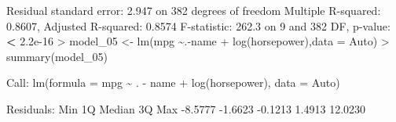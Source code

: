 \documentclass[
]{article}
\newenvironment{Shaded}{\begin{snugshade}}{\end{snugshade}}
\newcommand{\AttributeTok}[1]{\textcolor[rgb]{0.77,0.63,0.00}{#1}}
\newcommand{\DecValTok}[1]{\textcolor[rgb]{0.00,0.00,0.81}{#1}}
\newcommand{\ErrorTok}[1]{\textcolor[rgb]{0.64,0.00,0.00}{\textbf{#1}}}
\newcommand{\FloatTok}[1]{\textcolor[rgb]{0.00,0.00,0.81}{#1}}
\newcommand{\FunctionTok}[1]{\textcolor[rgb]{0.00,0.00,0.00}{#1}}
\newcommand{\NormalTok}[1]{#1}
\newcommand{\OtherTok}[1]{\textcolor[rgb]{0.56,0.35,0.01}{#1}}
\newcommand{\SpecialCharTok}[1]{\textcolor[rgb]{0.00,0.00,0.00}{#1}}
\begin{document}
\begin{Shaded}
\begin{Highlighting}[]
\NormalTok{Residual standard error}\SpecialCharTok{:} \FloatTok{2.947}\NormalTok{ on }\DecValTok{382}\NormalTok{ degrees of freedom}
\NormalTok{Multiple R}\SpecialCharTok{{-}}\NormalTok{squared}\SpecialCharTok{:}  \FloatTok{0.8607}\NormalTok{,    Adjusted R}\SpecialCharTok{{-}}\NormalTok{squared}\SpecialCharTok{:}  \FloatTok{0.8574} 
\NormalTok{F}\SpecialCharTok{{-}}\NormalTok{statistic}\SpecialCharTok{:} \FloatTok{262.3}\NormalTok{ on }\DecValTok{9}\NormalTok{ and }\DecValTok{382}\NormalTok{ DF,  p}\SpecialCharTok{{-}}\NormalTok{value}\SpecialCharTok{:} \ErrorTok{\textless{}} \FloatTok{2.2e{-}16}
\SpecialCharTok{\textgreater{}}\NormalTok{ model\_05 }\OtherTok{\textless{}{-}} \FunctionTok{lm}\NormalTok{(mpg }\SpecialCharTok{\textasciitilde{}}\NormalTok{.}\SpecialCharTok{{-}}\NormalTok{name }\SpecialCharTok{+} \FunctionTok{log}\NormalTok{(horsepower),}\AttributeTok{data =}\NormalTok{ Auto)}
\SpecialCharTok{\textgreater{}} \FunctionTok{summary}\NormalTok{(model\_05)}

\NormalTok{Call}\SpecialCharTok{:}
\FunctionTok{lm}\NormalTok{(}\AttributeTok{formula =}\NormalTok{ mpg }\SpecialCharTok{\textasciitilde{}}\NormalTok{ . }\SpecialCharTok{{-}}\NormalTok{ name }\SpecialCharTok{+} \FunctionTok{log}\NormalTok{(horsepower), }\AttributeTok{data =}\NormalTok{ Auto)}

\NormalTok{Residuals}\SpecialCharTok{:}
\NormalTok{    Min      1Q  Median      3Q     Max }
\SpecialCharTok{{-}}\FloatTok{8.5777} \SpecialCharTok{{-}}\FloatTok{1.6623} \SpecialCharTok{{-}}\FloatTok{0.1213}  \FloatTok{1.4913} \FloatTok{12.0230} 


\end{Highlighting}
\end{Shaded}
\end{document}
